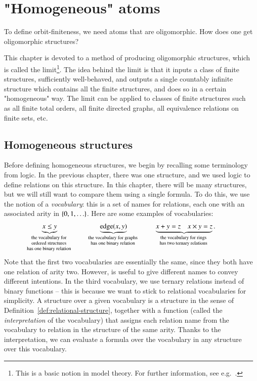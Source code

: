 
\chapter{"Homogeneous" atoms}
\label{sec:homogeneous-atoms}
To define orbit-finiteness, we need atoms that are oligomorphic. 
How does one get oligomorphic structures?

This chapter is devoted to a method of producing oligomorphic structures, which is called the \fraisse limit\footnote{This is a basic notion in model theory. For further information, see e.g.~\cite[Section 7]{hodges1993model}. 
}. The idea behind the \fraisse limit is that it inputs a class of finite structures, sufficiently well-behaved, and outputs a single countably infinite structure which contains all  the finite structures, and does so in a certain "homogeneous" way. The \fraisse limit can be applied to classes of finite structures such as all finite total orders, all finite directed graphs, all equivalence relations on finite sets, etc. 












\section{Homogeneous structures} 
Before defining homogeneous structures, we begin by recalling some terminology from logic. In the previous chapter, there was one structure, and we used logic to define relations on this structure. In this chapter, there will be many structures, but we will still want to compare them using a single formula. To do this, we use the notion of a  \emph{vocabulary}: this is a set of names for relations, each one with an associated arity in $\{0,1,\ldots\}$. Here are some examples of vocabularies: 
\begin{align*}
\myunderbrace{x \le y}{the vocabulary for \\ ordered structures \\ has one binary relation}
\qquad \qquad \qquad 
\myunderbrace{\text{edge}(x,y)}{the vocabulary for  graphs \\ has one binary relation}
\qquad \qquad 
\myunderbrace{x+y=z \quad x\times y = z}{the vocabulary for rings\\ has two ternary relations}.
\end{align*}
Note that the first two vocabularies are essentially the same, since they both have one relation of arity two. However, is useful to give different names to convey different intentions. In the third vocabulary, we use ternary relations instead of binary functions -- this is because we want to stick to relational vocabularies for simplicity. A structure over a given vocabulary is a structure in the sense of Definition~\ref{def:relational-structure}, together with a function (called the \emph{interpretation} of the vocabulary) that  assigns each relation name from the vocabulary to relation in the structure of the same arity. Thanks to the interpretation, we can evaluate a formula over the vocabulary in any structure over this vocabulary.  



